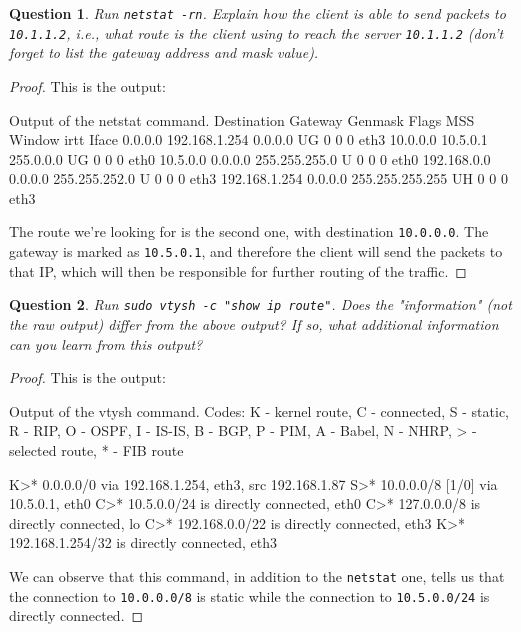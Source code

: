 \documentclass[a4paper,11pt,hidelinks]{article}
\newtheorem{theorem}{Question}[subsection]
\begin{document}
\begin{theorem}
    Run \verb=netstat -rn=. Explain how the client is able to send packets to \verb=10.1.1.2=, i.e., what route is the client using to reach the server \verb=10.1.1.2= (don't forget to list the gateway address and mask value).
\end{theorem}

\begin{proof}
    This is the output:

\begin{code}{Output of the netstat command.}
Destination     Gateway         Genmask         Flags   MSS Window  irtt Iface
0.0.0.0         192.168.1.254   0.0.0.0         UG        0 0          0 eth3
10.0.0.0        10.5.0.1        255.0.0.0       UG        0 0          0 eth0
10.5.0.0        0.0.0.0         255.255.255.0   U         0 0          0 eth0
192.168.0.0     0.0.0.0         255.255.252.0   U         0 0          0 eth3
192.168.1.254   0.0.0.0         255.255.255.255 UH        0 0          0 eth3
\end{code}
    
    The route we're looking for is the second one, with destination \verb=10.0.0.0=. The gateway is marked as \verb=10.5.0.1=, and therefore the client will send the packets to that IP, which will then be responsible for further routing of the traffic.
\end{proof}

\begin{theorem}
    Run \verb=sudo vtysh -c "show ip route"=. Does the "information" (not the raw output) differ from the above output? If so, what additional information can you learn from this output?
\end{theorem}

\begin{proof}
    This is the output:

\begin{code}{Output of the vtysh command.}
Codes: K - kernel route, C - connected, S - static, R - RIP,
O - OSPF, I - IS-IS, B - BGP, P - PIM, A - Babel, N - NHRP,
> - selected route, * - FIB route
 
K>* 0.0.0.0/0 via 192.168.1.254, eth3, src 192.168.1.87
S>* 10.0.0.0/8 [1/0] via 10.5.0.1, eth0
C>* 10.5.0.0/24 is directly connected, eth0
C>* 127.0.0.0/8 is directly connected, lo
C>* 192.168.0.0/22 is directly connected, eth3
K>* 192.168.1.254/32 is directly connected, eth3
\end{code}

    We can observe that this command, in addition to the \verb=netstat= one, tells us that the connection to \verb=10.0.0.0/8= is static while the connection to \verb=10.5.0.0/24= is directly connected.
\end{proof}
\end{document}

